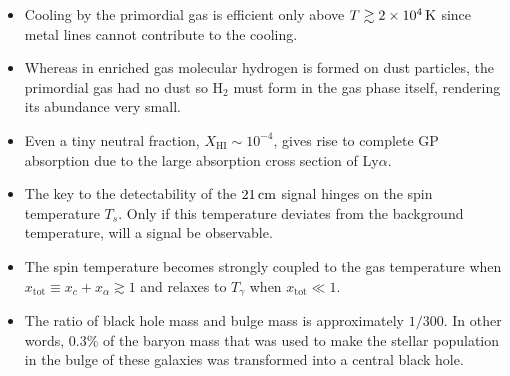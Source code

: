 \documentclass[a4paper,11pt]{article}
\begin{document}
\begin{itemize}
    \item Cooling by the primordial gas is efficient only above $T\gtrsim2\times10^4\,{\rm K}$ since metal lines cannot contribute to the cooling.
    \item Whereas in enriched gas molecular hydrogen is formed on dust particles, the primordial gas had no dust so H$_2$ must form in the gas phase itself, rendering its abundance very small.
    \item Even a tiny neutral fraction, $X_\mathrm{HI}\sim10^{-4}$, gives rise to complete GP absorption due to the large absorption cross section of Ly$\alpha$.
    \item The key to the detectability of the $21\,{\rm cm}$ signal hinges on the spin temperature $T_s$. Only if this temperature deviates from the background temperature, will a signal be observable.
    \item The spin temperature becomes strongly coupled to the gas temperature when $x_\mathrm{tot}\equiv x_c+x_\alpha\gtrsim1$ and relaxes to $T_\gamma$ when $x_\mathrm{tot}\ll1$.
    \item The ratio of black hole mass and bulge mass is approximately $1/300$. In other words, 0.3\% of the baryon mass that was used to make the stellar population in the bulge of these galaxies was transformed into a central black hole.
    \end{itemize}
\end{document}
